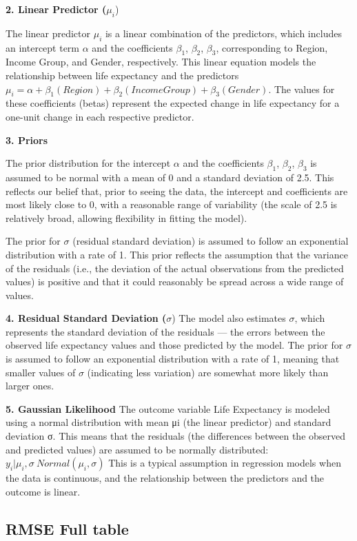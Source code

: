 \documentclass[
  letterpaper,
  DIV=11,
  numbers=noendperiod]{scrartcl}
\begin{document}
\textbf{2. Linear Predictor (}\(μ_i\))

The linear predictor \(μ_i\) is a linear combination of the predictors,
which includes an intercept term \(α\) and the coefficients \(β_1\),
\(β_2\), \(β_3\), corresponding to Region, Income Group, and Gender,
respectively. This linear equation models the relationship between life
expectancy and the predictors
\(\mu_i = \alpha + \beta_1(Region) + \beta_2(Income Group) + \beta_3 (Gender)\).
The values for these coefficients (betas) represent the expected change
in life expectancy for a one-unit change in each respective predictor.

\textbf{3. Priors}

The prior distribution for the intercept \(α\) and the coefficients
\(β_1\), \(β_2\), \(β_3\) is assumed to be normal with a mean of 0 and a
standard deviation of 2.5. This reflects our belief that, prior to
seeing the data, the intercept and coefficients are most likely close to
0, with a reasonable range of variability (the scale of 2.5 is
relatively broad, allowing flexibility in fitting the model).

The prior for \(σ\) (residual standard deviation) is assumed to follow
an exponential distribution with a rate of 1. This prior reflects the
assumption that the variance of the residuals (i.e., the deviation of
the actual observations from the predicted values) is positive and that
it could reasonably be spread across a wide range of values.

\textbf{4. Residual Standard Deviation (}\(σ\)) The model also estimates
\(σ\), which represents the standard deviation of the residuals --- the
errors between the observed life expectancy values and those predicted
by the model. The prior for \(σ\) is assumed to follow an exponential
distribution with a rate of 1, meaning that smaller values of \(σ\)
(indicating less variation) are somewhat more likely than larger ones.

\textbf{5. Gaussian Likelihood} The outcome variable Life Expectancy is
modeled using a normal distribution with mean μi (the linear predictor)
and standard deviation σ. This means that the residuals (the differences
between the observed and predicted values) are assumed to be normally
distributed: \(y_i| \mu_i, \sigma ~ Normal(\mu_i, \sigma)\) This is a
typical assumption in regression models when the data is continuous, and
the relationship between the predictors and the outcome is linear.

\subsection{RMSE Full table}\label{rmse-full-table}
\end{document}
